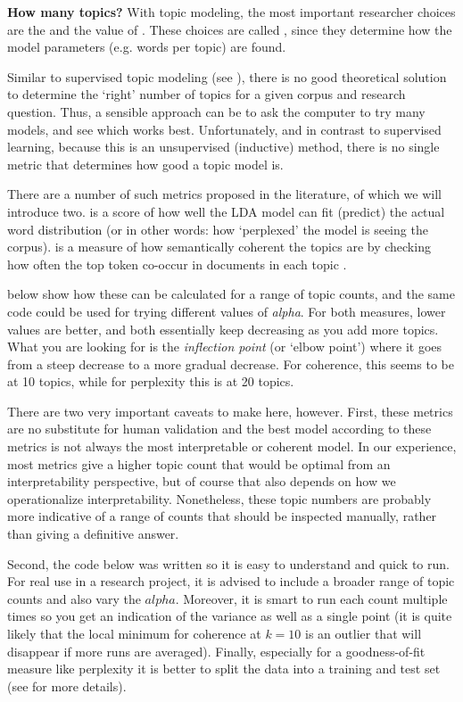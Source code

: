 
\begin{feature}
  \textbf{How many topics?}
  With topic modeling, the most important researcher choices are the  and the value of .
  These choices are called , since they determine how the model parameters (e.g. words per topic) are found.

  Similar to supervised topic modeling (see ),
  there is no good theoretical solution to determine the `right' number of topics for a given corpus and research question.
  Thus, a sensible approach can be to ask the computer to try many models, and see which works best.
  Unfortunately, and in contrast to supervised learning, because this is an unsupervised (inductive) method,
  there is no single metric that determines how good a topic model is.

  There are a number of such metrics proposed in the literature, of which we will introduce two.
   is a score of how well the LDA model can fit (predict) the actual word distribution
  (or in other words: how `perplexed' the model is seeing the corpus).
   is a measure of how semantically coherent the topics are by checking how often the top token co-occur in documents in each topic \citep{minmo11}.

   below show how these can be calculated for a range of topic counts, and the same code could be used for trying different values of \emph{alpha}.
  For both measures, lower values are better, and both essentially keep decreasing as you add more topics.
  What you are looking for is the \emph{inflection point} (or `elbow point') where it goes from a steep decrease to a more gradual decrease.
  For coherence, this seems to be at 10 topics, while for perplexity this is at 20 topics.

  There are two very important caveats to make here, however.
  First, these metrics are no substitute for human validation and the best model according to these metrics is not always the most interpretable or coherent model.
  In our experience, most metrics give a higher topic count that would be optimal from an interpretability perspective, but of course that also depends on how we operationalize interpretability.
  Nonetheless, these topic numbers are probably more indicative of a range of counts that should be inspected manually, rather than giving a definitive answer.

  Second, the code below was written so it is easy to understand and quick to run.
  For real use in a research project, it is advised to include a broader range of topic counts and also vary the $alpha$.
  Moreover, it is smart to run each count multiple times so you get an indication of the variance as well as a single point
  (it is quite likely that the local minimum for coherence at $k=10$ is an outlier that will disappear if more runs are averaged).
  Finally, especially for a goodness-of-fit measure like perplexity it is better to split the data into a training and test set
  (see  for more details).

\end{feature}

